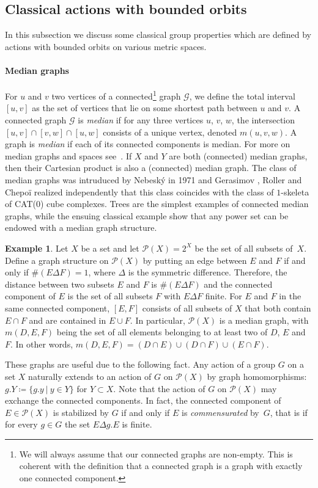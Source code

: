 \documentclass[a4paper]{article}
\theoremstyle{definition}
\newtheorem{exmp}[lem]{Example}
\newcommand{\setst}[2]{\{#1\ |\ #2\}}
\newcommand*{\powerset}[1]{\mathcal P(#1)}
\begin{document}
\subsection{Classical actions with bounded orbits}
%
%
%
In this subsection we discuss some classical group properties which are defined by actions with bounded orbits on various metric spaces.

\paragraph{Median graphs}
For $u$ and $v$ two vertices of a connected\footnote{We will always assume that our connected graphs are non-empty. This is coherent with the definition that a connected graph is a graph with exactly one connected component.} graph $\mathcal G$, we define the total interval $[u,v]$ as the set of vertices that lie on some shortest path between $u$ and $v$.
A connected graph $\mathcal G$ is \emph{median} if for any three vertices $u$, $v$, $w$, the intersection $[u,v]\cap[v,w]\cap[u,w]$ consists of a unique vertex, denoted $m(u,v,w)$.
A graph is \emph{median} if each of its connected components is median. For more on median graphs and spaces see~\cite{MR2405677,MR2671183,MR1705337}.
If $X$ and $Y$ are both (connected) median graphs, then their Cartesian product is also a (connected) median graph.
The class of median graphs was intruduced by Nebesk\'y in 1971 \cite{Neb71} and Gerasimov \cite{MR1663779, Ger97},   Roller \cite{Rol98} and Chepoï \cite{Che00} realized independently that this class coincides with the class of $1$-skeleta of CAT(0) cube complexes.
Trees are the simplest examples of connected median graphs, while the ensuing classical example show that any power set can be endowed with a median graph structure.
%
%
\begin{exmp}\label{Ex:MainMedian}
Let $X$ be a set and let  $\powerset{X}=2^X$ be the set of all subsets of~$X$.
Define a graph structure on $\powerset{X}$ by putting an edge between $E$ and $F$ if and only if $\#(E\Delta F)=1$, where $\Delta$ is the symmetric difference.
Therefore, the distance between two subsets $E$ and $F$ is $\#(E\Delta F)$ and
the connected component of $E$ is the set of all subsets $F$ with $E\Delta F$ finite.
For $E$ and $F$ in the same connected component, $[E,F]$ consists of all subsets of $X$ that both contain $E\cap F$ and are contained in $E\cup F$.
In particular, $\powerset{X}$ is a median graph, with $m(D,E,F)$ being the set of all elements belonging to at least two of $D$, $E$ and~$F$. In other words, $m(D,E,F)=(D\cap E)\cup(D\cap F)\cup(E\cap F)$.
\end{exmp}
%
%
These graphs are useful due to the following fact.
Any action of a group $G$ on a set $X$ naturally extends to an action of $G$ on $\powerset{X}$ by graph homomorphisms: $g.Y\coloneqq\setst{g.y}{y\in Y}$ for $Y\subset X$.
Note that the action of $G$ on $\powerset{X}$ may exchange the connected components.
In fact, the connected component of $E\in \powerset{X}$ is stabilized by $G$ if and only if $E$ is \emph{commensurated} by~$G$, that is if for every $g\in G$ the set $E\Delta g.E$ is finite.
%
%
%
%
\end{document}
